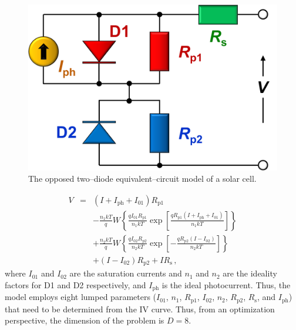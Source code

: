 \documentclass[a4paper,fleqn]{cas-dc}
\begin{document}
\begin{figure}[]
	\centering
		\includegraphics[width=0.75\columnwidth]{Chem}
	  \caption{The opposed two--diode equivalent--circuit model of a solar cell.}\label{fig_chem}
\end{figure}


\begin{eqnarray}
\label{eqIV_W}
V&=& (I+I_\mathrm{ph}+I_{01})R_\mathrm{p1} \nonumber \\
  &&-\frac{n_1kT}{q}W\left\{\frac{qI_{01}R_\mathrm{p1}}{n_1kT}\exp\left[\frac{qR_\mathrm{p1}(I+I_\mathrm{ph}+I_{01})}{n_1kT}\right]\right\} \nonumber \\
  &&+\frac{n_2kT}{q}W\left\{\frac{qI_{02}R_\mathrm{p2}}{n_2kT}\exp\left[-\frac{qR_\mathrm{p2}(I-I_{02})}{n_2kT}\right]\right\} \nonumber \\
  &&+(I-I_{02})R_\mathrm{p2}+IR_\mathrm{s}\,,
\end{eqnarray}
where
$I_{01}$ and $I_{02}$ are the saturation currents and
$n_1$ and $n_2$ are
the ideality factors for D1 and D2 respectively,
and $I_\mathrm{ph}$ is the ideal photocurrent.
Thus, the model employs eight lumped parameters
($I_{01}$, $n_1$, $R_\mathrm{p1}$, $I_{02}$, $n_2$, $R_\mathrm{p2}$,
$R_\mathrm{s}$, and $I_\mathrm{ph}$)
that need to be determined from the IV curve.
Thus, from an optimization perspective, the dimension of the problem is $D=8$.
\end{document}
